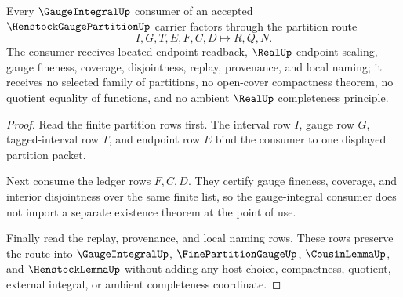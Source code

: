 \begin{theorem}
\label{thm:henstock-gauge-partition-integral-consumer}
Every $\GaugeIntegralUp$ consumer of an accepted $\HenstockGaugePartitionUp$ carrier factors through the partition route
$$
I,G,T,E,F,C,D \longmapsto R,Q,N .
$$
The consumer receives located endpoint readback, $\RealUp$ endpoint sealing, gauge fineness, coverage, disjointness, replay, provenance, and local naming; it receives no selected family of partitions, no open-cover compactness theorem, no quotient equality of functions, and no ambient $\RealUp$ completeness principle.
\end{theorem}
\begin{proof}
Read the finite partition rows first. The interval row $I$, gauge row $G$, tagged-interval row $T$, and endpoint row $E$ bind the consumer to one displayed partition packet.

Next consume the ledger rows $F,C,D$. They certify gauge fineness, coverage, and interior disjointness over the same finite list, so the gauge-integral consumer does not import a separate existence theorem at the point of use.

Finally read the replay, provenance, and local naming rows. These rows preserve the route into $\GaugeIntegralUp$, $\FinePartitionGaugeUp$, $\CousinLemmaUp$, and $\HenstockLemmaUp$ without adding any host choice, compactness, quotient, external integral, or ambient completeness coordinate.
\end{proof}




